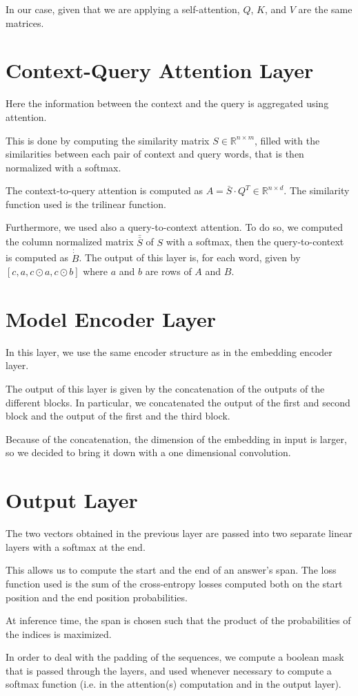         In our case, given that we are applying a self-attention, $Q$, $K$, and $V$ are the same matrices.
    
    \section{Context-Query Attention Layer}
        Here the information between the context and the query is aggregated using attention. 
        
        This is done by computing the similarity matrix $S \in \mathbb{R}^{n \times m}$, filled with the similarities between each pair of context and query words, that
        is then normalized with a softmax. 
        
        The context-to-query attention is computed as $A = \bar{S} \cdot Q^{T} \in \mathbb{R}^{n \times d}$. 
        The similarity function used is the trilinear function. 
        
        Furthermore, we used also a query-to-context attention.
        To do so, we computed the column normalized matrix $\bar{\bar{S}}$ of $S$ with a softmax, then the query-to-context is computed as 
        $\dot{\dot{B}}$. The output of this layer is, for each word, given by $[c, a, c \odot a, c \odot b]$ where $a$ and $b$ are rows of $A$ and $B$. 

    \section{Model Encoder Layer}
        In this layer, we use the same encoder structure as in the embedding encoder layer. 
        
        The output of this layer is given by the concatenation of the outputs of the different blocks.
        In particular, we concatenated the output of the first and second block and the output of the first and the third block. 
        
        Because of the concatenation, the dimension of the embedding in input is larger, so we decided to bring it down with a one
        dimensional convolution.

    \section{Output Layer}
        The two vectors obtained in the previous layer are passed into two separate linear layers with a softmax at the end. 
        
        This allows us to compute the start and the end of an answer's span. The loss function used is the sum of the cross-entropy 
        losses computed both on the start position and the end position probabilities.

        At inference time, the span is chosen such that the product of the probabilities of the indices is maximized.
    
    In order to deal with the padding of the sequences, we compute a boolean mask that is passed through the layers, and used whenever
    necessary to compute a softmax function (i.e. in the attention(s) computation and in the output layer).

